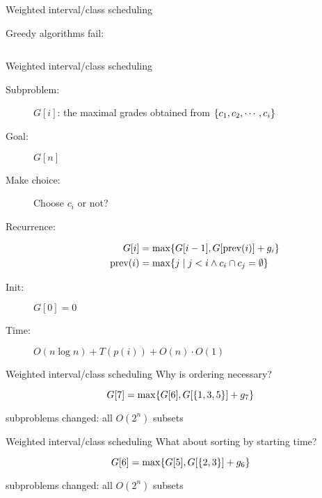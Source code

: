 \begin{frame}{Weighted interval/class scheduling}
  \centerline{Greedy algorithms fail:}
  
  \vspace{0.30cm}
  \begin{columns}
	  \pause
  \end{columns}
\end{frame}
\begin{frame}{Weighted interval/class scheduling}
  \begin{description}
	\item[Subproblem:] $G[i]$: the maximal grades obtained from $\{c_{1}, c_{2}, \cdots, c_{i}\}$
	\item[Goal:] $G[n]$
	  \pause
	\item[Make choice:] Choose $c_{i}$ or not?  
	\item[Recurrence:] 
	  \begin{align*}
		G[i] &= \max \{G[i-1], G[\text{prev}(i)] + g_{i}\}  \\
		\text{prev}(i) &= \max\{j \mid j < i \land c_{i} \cap c_{j} = \emptyset\}
	  \end{align*}
	  \pause
	\item[Init:] $G[0] = 0$
	\item[Time:] $O(n \log n) + T(p(i)) + O(n) \cdot O(1)$
  \end{description}
\end{frame}
\begin{frame}{Weighted interval/class scheduling}
  Why is ordering necessary?

  \[
	G[7] = \max \{G[6], G[\{1,3,5\}] + g_{7}\}
  \]

  \begin{center}
	subproblems changed: all $O(2^{n})$ subsets
  \end{center}
\end{frame}
\begin{frame}{Weighted interval/class scheduling}
  What about sorting by starting time?

  \[
	G[6] = \max \{G[5], G[\{2,3\}] + g_{6}\}
  \]

  \begin{center}
	subproblems changed: all $O(2^{n})$ subsets
  \end{center}
\end{frame}
